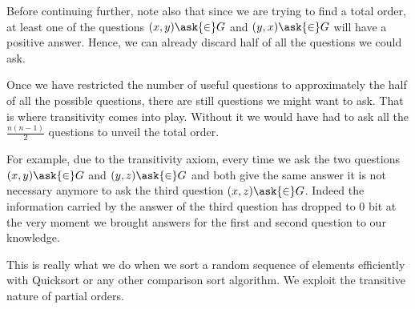 Before continuing further, note also that since we are trying to find a total
order, at least one of the questions $(x, y) \ask{\in} G$ and $(y, x)
\ask{\in} G$ will have a positive answer. Hence, we can already discard
half of all the questions we could ask.

Once we have restricted the number of useful questions to approximately the
half of all the possible questions, there are still  questions we
might want to ask. That is where transitivity comes into play. Without it we
would have had to ask all the $\frac{n (n-1)}{2}$ questions to unveil the total
order.

For example, due to the transitivity axiom, every time we ask the two questions
$(x, y) \ask{\in} G$ and $(y, z) \ask{\in} G$ and both give the
same answer it is not necessary anymore to ask the third question $(x, z)
\ask{\in} G$. Indeed the information carried by the answer of the
third question has dropped to 0 bit at the very moment we brought answers for
the first and second question to our knowledge.

This is really what we do when we sort a random sequence of elements
efficiently with Quicksort or any other  comparison sort
algorithm. We exploit the transitive nature of partial orders.
